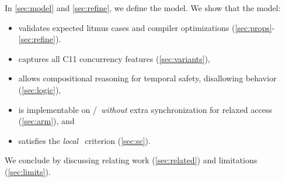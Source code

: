 

In \textsection\ref{sec:model} and \textsection\ref{sec:refine}, we define the model.  We show that the model:
\begin{itemize}
\item validates expected litmus cases and compiler optimizations
  (\textsection\ref{sec:props}-\ref{sec:refine}).

\item captures all C11 concurrency features  %
  (\textsection\ref{sec:variants}),

\item allows compositional reasoning for temporal safety, disallowing \oota{} behavior %
  (\textsection\ref{sec:logic}),

\item is implementable on \armeight/\tso\ {\em without} extra synchronization for
  relaxed access (\textsection\ref{sec:arm}), and

\item  satisfies the \emph{local} \drfsc\ criterion \cite{Dolan:2018:BDR:3192366.3192421} (\textsection\ref{sec:sc}).

\end{itemize}
We conclude by discussing relating work (\textsection\ref{sec:related}) and limitations (\textsection\ref{sec:limits}).


